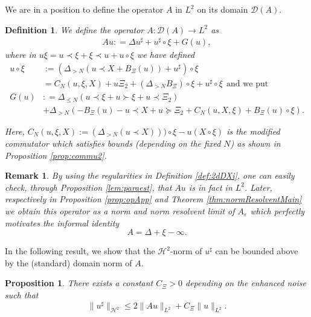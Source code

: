 \documentclass[11pt, oneside]{article}   	%
\newtheorem{definition}[theorem]{Definition}
\newtheorem{proposition}[theorem]{Proposition}
\newtheorem{remark}[theorem]{Remark}
\newcommand{\ssp}{\mathscr{H}}
\begin{document}
We are in a position to define the operator $A$ in $L^2$ on  its domain $\mathscr{D}(A)$.

\begin{definition}
We define the  operator $A:\mathscr{D}(A) \to L^2$ as
	\begin{align} \label{equ:defandersonHam}
	A u : = \Delta u^{\sharp} + u^{\sharp} \circ \xi + G (u),\end{align}
	 where in $u \xi= u \prec \xi +  \xi \prec u+ u\circ \xi$
	 we have defined
\begin{align*} u \circ \xi&:= (\Delta_{> N}(u\prec X +B_{\Xi}(u))+u^\sharp) \circ \xi\\
&= C_N (u, \xi, X) + u\Xi_2  + (\Delta_{> N}B_{\Xi}) \circ \xi + u^\sharp \circ \xi \ \ \text{and we put} \  \  \\
G (u) &: = \Delta_{\le N} (u \prec \xi + u \succ \xi + u \prec \Xi_{2})\\ &+ \Delta_{>
	N} (- B_{\Xi} (u) - u \prec X + u \succcurlyeq \Xi_2 + C_N (u,
X, \xi) + B_{\Xi} (u) \circ \xi). \end{align*}

Here, $C_N (u, \xi, X) := \left(\Delta_{> N} (u\prec X)\right))\circ \xi- u(X\circ \xi)$ is the modified commutator which satisfies bounds (depending on the fixed $N$) as shown in Proposition \ref{prop:commu2}.

	
\end{definition}

\begin{remark}\upshape
	By using the regularities in Definition \ref{def:2dDXi}, one can easily check, through Proposition \ref{lem:paraest}, that $Au$ is in fact in $L^2$.  Later, respectively in Proposition \ref{prop:opApp} and Theorem \ref{thm:normResolventMain}  we obtain this operator as a norm and norm resolvent limit of $A_\varepsilon$ which perfectly motivates the informal identity
	\[
	A = \Delta + \xi - \infty.
	\]
\end{remark}

In the following result, we show that the $\ssp^2$-norm of $u^\sharp$ can be bounded above by the (standard) domain norm of $A$.


\begin{proposition} \label{lem:h2bound}
	There exists a constant $C_{\Xi} > 0$ depending on the enhanced
	noise such that
	\begin{equation}\label{equ:h2bound}
	\| u^{\sharp} \|_{\ssp^2} \le 2 \| A u \|_{L^2} + C_{\Xi} \| u
	\|_{L^2}. \end{equation}
\end{proposition}
\end{document}
